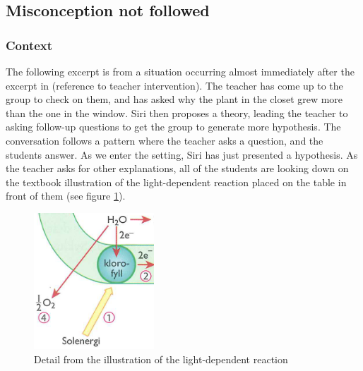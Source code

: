 \subsection{Misconception not followed}

\subsubsection*{Context}
The following excerpt is from a situation occurring almost immediately after the excerpt in (reference to teacher intervention). The teacher has come up to the group to check on them, and has asked why the plant in the closet grew more than the one in the window. Siri then proposes a theory, leading the teacher to asking follow-up questions to get the group to generate more hypothesis. The conversation follows a pattern where the teacher asks a question, and the students answer. As we enter the setting, Siri has just presented a hypothesis. As the teacher asks for other explanations, all of the students are looking down on the textbook illustration of the light-dependent reaction placed on the table in front of them (see figure \ref{fig:lightdependentdetail}). 

\begin{figure}
\centering
\includegraphics[width=0.4\textwidth]{img/data_analysis/light_dependent_detail.png}
\caption{Detail from the illustration of the light-dependent reaction \citep{bios}}
\label{fig:lightdependentdetail}
\end{figure}

